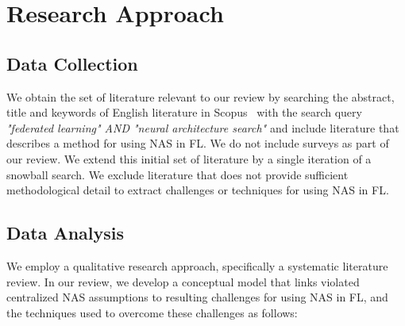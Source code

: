 \section{Research Approach}

\subsection{Data Collection}

We obtain the set of literature relevant to our review by searching the abstract, title and keywords of English literature in Scopus~\cite{scopus} with the search query \textit{"federated learning" AND "neural architecture search"} and include literature that describes a method for using NAS in FL. We do not include surveys as part of our review. We extend this initial set of literature by a single iteration of a snowball search. We exclude literature that does not provide sufficient methodological detail to extract challenges or techniques for using NAS in FL.

\subsection{Data Analysis}

We employ a qualitative research approach, specifically a systematic literature review. In our review, we develop a conceptual model that links violated centralized NAS assumptions to resulting challenges for using NAS in FL, and the techniques used to overcome these challenges as follows:

